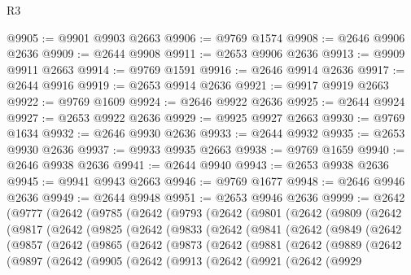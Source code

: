\begin{lexlean}{R3}
\begin{coremodule}
@9905 := @9901 @9903 @2663
@9906 := @9769 @1574
@9908 := @2646 @9906 @2636
@9909 := @2644 @9908
@9911 := @2653 @9906 @2636
@9913 := @9909 @9911 @2663
@9914 := @9769 @1591
@9916 := @2646 @9914 @2636
@9917 := @2644 @9916
@9919 := @2653 @9914 @2636
@9921 := @9917 @9919 @2663
@9922 := @9769 @1609
@9924 := @2646 @9922 @2636
@9925 := @2644 @9924
@9927 := @2653 @9922 @2636
@9929 := @9925 @9927 @2663
@9930 := @9769 @1634
@9932 := @2646 @9930 @2636
@9933 := @2644 @9932
@9935 := @2653 @9930 @2636
@9937 := @9933 @9935 @2663
@9938 := @9769 @1659
@9940 := @2646 @9938 @2636
@9941 := @2644 @9940
@9943 := @2653 @9938 @2636
@9945 := @9941 @9943 @2663
@9946 := @9769 @1677
@9948 := @2646 @9946 @2636
@9949 := @2644 @9948
@9951 := @2653 @9946 @2636
@9999 := @2642
    (@9777
      (@2642
        (@9785
          (@2642
            (@9793
              (@2642
                (@9801
                  (@2642
                    (@9809
                      (@2642
                        (@9817
                          (@2642
                            (@9825
                              (@2642
                                (@9833
                                  (@2642
                                    (@9841
                                      (@2642
                                        (@9849
                                          (@2642
                                            (@9857
                                              (@2642
                                                (@9865
                                                  (@2642
                                                    (@9873
                                                      (@2642
                                                        (@9881
                                                          (@2642
                                                            (@9889
                                                              (@2642
                                                                (@9897
                                                                  (@2642
                                                                    (@9905
                                                                      (@2642
                                                                        (@9913
                                                                          (@2642
                                                                            (@9921
                                                                              (@2642
                                                                                (@9929

\end{coremodule}
\end{lexlean}
